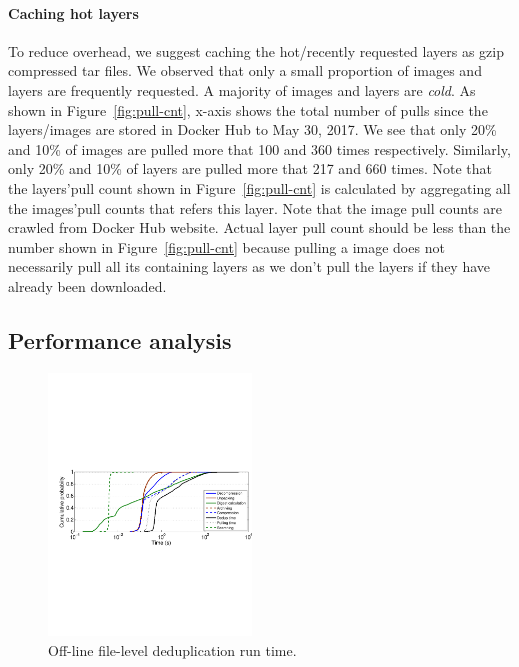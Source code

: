 \paragraph{Caching hot layers}
To reduce overhead, we suggest caching the hot/recently requested layers as
gzip compressed tar files. 
%
We observed that only a small proportion of images
and layers are frequently requested. 
%
A majority of images and layers are
\textit{cold}. 
%
As shown in Figure~\ref{fig:pull-cnt}, x-axis shows the total
number of pulls since the layers/images are stored in Docker Hub to May 30,
2017. 
%
We see that only 20\% and 10\% of images are pulled more that 100 and
360 times respectively. 
%
Similarly, only 20\% and 10\% of layers are pulled more
that 217 and 660 times. 
%
Note that the layers'pull count shown in
Figure~\ref{fig:pull-cnt} is calculated by aggregating all the images'pull
counts that refers this layer. 
%
Note that the image pull counts are crawled from
Docker Hub website. 
%
Actual layer pull count should be less than the number
shown in Figure~\ref{fig:pull-cnt} because pulling a image does not necessarily
pull all its containing layers as we don't pull the layers if they have already
been downloaded.


\subsection{Performance analysis}
%
\begin{figure}
	\centering
	\includegraphics[width=0.48\textwidth]{graphs/res-time.pdf}
	\caption{Off-line file-level deduplication run time.
	}
	\label{fig:dedup-res}
\end{figure}

%
%
%

